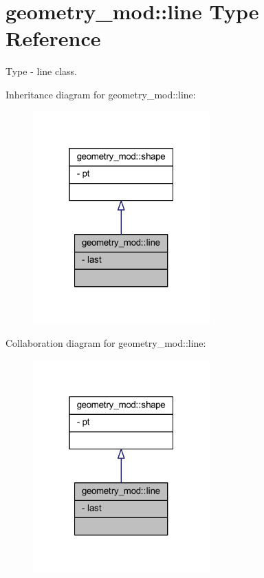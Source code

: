 \hypertarget{structgeometry__mod_1_1line}{}\section{geometry\+\_\+mod\+:\+:line Type Reference}
\label{structgeometry__mod_1_1line}


Type -\/ line class.  




Inheritance diagram for geometry\+\_\+mod\+:\+:line\+:\nopagebreak
\begin{figure}[H]
\begin{center}
\leavevmode
\includegraphics[width=193pt]{structgeometry__mod_1_1line__inherit__graph}
\end{center}
\end{figure}


Collaboration diagram for geometry\+\_\+mod\+:\+:line\+:\nopagebreak
\begin{figure}[H]
\begin{center}
\leavevmode
\includegraphics[width=193pt]{structgeometry__mod_1_1line__coll__graph}
\end{center}
\end{figure}

